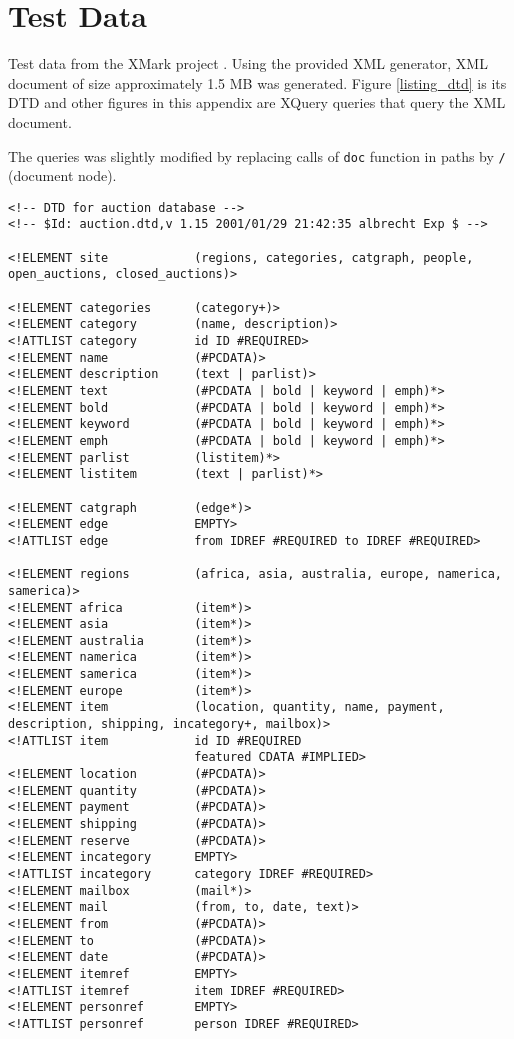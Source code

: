 \chapter{Test Data} \label{APPENDIX_test_data}

Test data from the XMark project \cite{xmark}. Using the provided XML generator, XML document of size approximately 1.5 MB was generated. Figure \ref{listing_dtd} is its DTD and other figures in this appendix are XQuery queries that query the XML document.

The queries was slightly modified by replacing calls of \texttt{doc} function in paths by \texttt{/} (document node).

\begin{lstlisting}[caption=DTD of the test XML data, frame=single, label=listing_dtd]
<!-- DTD for auction database -->
<!-- $Id: auction.dtd,v 1.15 2001/01/29 21:42:35 albrecht Exp $ -->

<!ELEMENT site            (regions, categories, catgraph, people, open_auctions, closed_auctions)>

<!ELEMENT categories      (category+)>
<!ELEMENT category        (name, description)>
<!ATTLIST category        id ID #REQUIRED>
<!ELEMENT name            (#PCDATA)>
<!ELEMENT description     (text | parlist)>
<!ELEMENT text            (#PCDATA | bold | keyword | emph)*>
<!ELEMENT bold            (#PCDATA | bold | keyword | emph)*>
<!ELEMENT keyword         (#PCDATA | bold | keyword | emph)*>
<!ELEMENT emph            (#PCDATA | bold | keyword | emph)*>
<!ELEMENT parlist         (listitem)*>
<!ELEMENT listitem        (text | parlist)*>

<!ELEMENT catgraph        (edge*)>
<!ELEMENT edge            EMPTY>
<!ATTLIST edge            from IDREF #REQUIRED to IDREF #REQUIRED>

<!ELEMENT regions         (africa, asia, australia, europe, namerica, samerica)>
<!ELEMENT africa          (item*)>
<!ELEMENT asia            (item*)>
<!ELEMENT australia       (item*)>
<!ELEMENT namerica        (item*)>
<!ELEMENT samerica        (item*)>
<!ELEMENT europe          (item*)>
<!ELEMENT item            (location, quantity, name, payment, description, shipping, incategory+, mailbox)>
<!ATTLIST item            id ID #REQUIRED
                          featured CDATA #IMPLIED>
<!ELEMENT location        (#PCDATA)>
<!ELEMENT quantity        (#PCDATA)>
<!ELEMENT payment         (#PCDATA)>
<!ELEMENT shipping        (#PCDATA)>
<!ELEMENT reserve         (#PCDATA)>
<!ELEMENT incategory      EMPTY>
<!ATTLIST incategory      category IDREF #REQUIRED>
<!ELEMENT mailbox         (mail*)>
<!ELEMENT mail            (from, to, date, text)>
<!ELEMENT from            (#PCDATA)>
<!ELEMENT to              (#PCDATA)>
<!ELEMENT date            (#PCDATA)>
<!ELEMENT itemref         EMPTY>
<!ATTLIST itemref         item IDREF #REQUIRED>
<!ELEMENT personref       EMPTY>
<!ATTLIST personref       person IDREF #REQUIRED>


\end{lstlisting}
